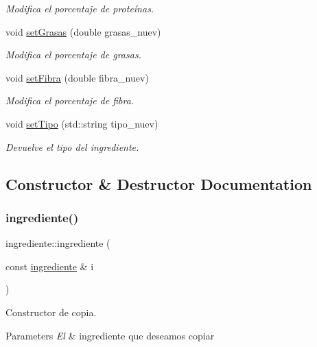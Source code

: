 \begin{DoxyCompactItemize}
\begin{DoxyCompactList}\small\item\em Modifica el porcentaje de proteínas. \end{DoxyCompactList}\item 
void \hyperlink{classingrediente_aa37c96f2c86407808372b6f3d51dc4b6}{set\+Grasas} (double grasas\+\_\+nuev)
\begin{DoxyCompactList}\small\item\em Modifica el porcentaje de grasas. \end{DoxyCompactList}\item 
void \hyperlink{classingrediente_ab7a915b7409d0ab8c585b315610da15d}{set\+Fibra} (double fibra\+\_\+nuev)
\begin{DoxyCompactList}\small\item\em Modifica el porcentaje de fibra. \end{DoxyCompactList}\item 
void \hyperlink{classingrediente_a2bc30d0ced2ccdec801052d2141eaa32}{set\+Tipo} (std\+::string tipo\+\_\+nuev)
\begin{DoxyCompactList}\small\item\em Devuelve el tipo del ingrediente. \end{DoxyCompactList}\end{DoxyCompactItemize}


\subsection{Constructor \& Destructor Documentation}
\mbox{\label{classingrediente_a2a0a1afbd9b6a73e3d6857cdf42852a4}} 
\subsubsection{\texorpdfstring{ingrediente()}{ingrediente()}}
{\footnotesize\ttfamily ingrediente\+::ingrediente (\begin{DoxyParamCaption}\item[{const \hyperlink{classingrediente}{ingrediente} \&}]{i }\end{DoxyParamCaption})}



Constructor de copia. 


\begin{DoxyParams}{Parameters}
{\em El} & ingrediente que deseamos copiar \\
\hline
\end{DoxyParams}


